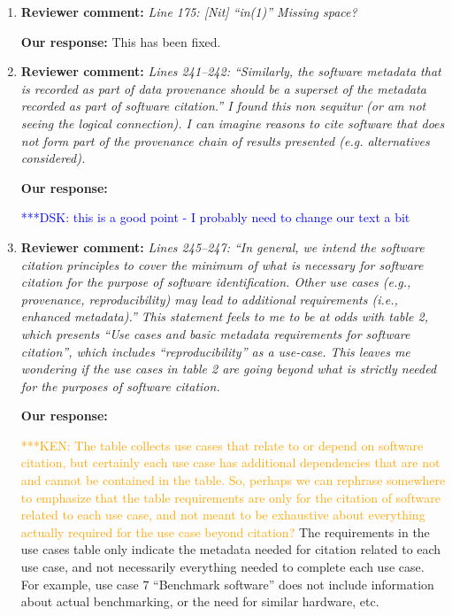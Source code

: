 \documentclass{article}
\newcommand{\katznote}[1]{ {\textcolor{blue} { ***DSK: #1 }}} %
\newcommand{\niemnote}[1]{ {\textcolor{orange} { ***KEN: #1 }}} %
\begin{document}
\begin{enumerate}
\katznote{also as a general comment, see the new intro to appendix B that states that some of this may be incomplete or wrong, but is included as a record to support the process that come up with the body of the document, and that Appendix B will be subject to further work in the future.}

\item \textbf{Reviewer comment:}
\emph{Line 175: [Nit] ``in(1)'' Missing space?}

\textbf{Our response:}
This has been fixed.

\item \textbf{Reviewer comment:}
\emph{Lines 241--242: ``Similarly, the software metadata that is recorded as part of data provenance should be a superset of the metadata recorded as part of software citation.'' I found this non sequitur (or am not seeing the logical connection). I can imagine reasons to cite software that does not form part of the provenance chain of results presented (e.g. alternatives considered).}

\textbf{Our response:}

\katznote{this is a good point - I probably need to change our text a bit}

\item \textbf{Reviewer comment:}
\emph{Lines 245--247: ``In general, we intend the software citation principles to cover the minimum of what is necessary for software citation for the purpose of software identification. Other use cases (e.g., provenance, reproducibility) may lead to additional requirements (i.e., enhanced metadata).'' This statement feels to me to be at odds with table 2, which presents ``Use cases and basic metadata requirements for software citation'', which includes ``reproducibility'' as a use-case. This leaves me wondering if the use cases in table 2 are going beyond what is strictly needed for the purposes of software citation.}

\textbf{Our response:}

\niemnote{The table collects use cases that relate to or depend on software citation, but certainly each use case has additional dependencies that are not and cannot be contained in the table. So, perhaps we can rephrase somewhere to emphasize that the table requirements are only for the citation of software related to each use case, and not meant to be exhaustive about everything actually required for the use case beyond citation?}
The requirements in the use cases table only indicate the metadata needed for citation related to each use case, and not necessarily everything needed to complete each use case. For example, use case 7 ``Benchmark software'' does not include information about actual benchmarking, or the need for similar hardware, etc.


\end{enumerate}
\end{document}
